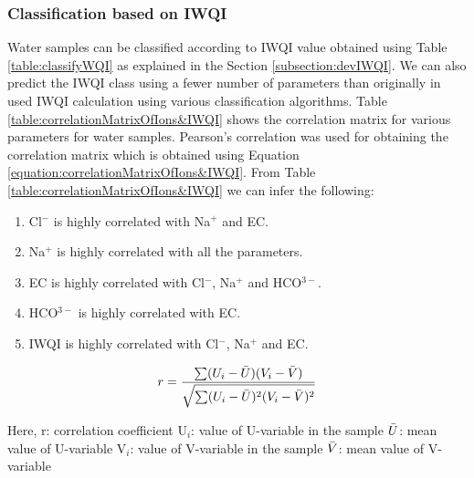 \subsubsection{Classification based on IWQI}
\label{subsubsection:classificationBasedOnIWQI}
Water samples can be classified according to IWQI value obtained using Table \ref{table:classifyWQI} as explained in the Section \ref{subsection:devIWQI}. We can also predict the IWQI class using a fewer number of parameters than originally in used IWQI calculation using various classification algorithms. Table \ref{table:correlationMatrixOfIons&IWQI} shows the correlation matrix for various parameters for water samples. Pearson’s correlation was used for obtaining the correlation matrix which is obtained using Equation \ref{equation:correlationMatrixOfIons&IWQI}. From Table \ref{table:correlationMatrixOfIons&IWQI} we can infer the following:
\begin{enumerate}
    \item Cl$^-$ is highly correlated with Na$^+$ and EC.
    \item Na$^+$ is highly correlated with all the parameters.
    \item EC is highly correlated with Cl$^-$, Na$^+$ and HCO$^{3-}$.
    \item HCO$^{3-}$ is highly correlated with EC.
    \item IWQI is highly correlated with Cl$^-$, Na$^+$ and EC.
\end{enumerate}

\begin{equation}
    r = \frac{\sum(U_i - \Bar{U})(V_i - \Bar{V})}{\sqrt{\sum(U_i - \Bar{U})^2(V_i - \Bar{V})^2}}
\label{equation:correlationMatrixOfIons&IWQI}
\end{equation}

Here, \newline
r: correlation coefficient \newline
U$_i$: value of U-variable in the sample \newline
$\Bar{U}$: mean value of U-variable \newline
V$_i$: value of V-variable in the sample \newline
$\Bar{V}$: mean value of V-variable


